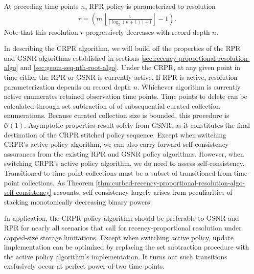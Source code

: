 At preceding time points $n$, RPR policy is parameterized to resolution
\begin{align*}
r = \left(
  m \,
  \left\lfloor
  \frac{1}{\lceil \log_2(n + 1) \rceil + 1}
  \right\rfloor
  - 1
\right).
\end{align*}
Note that this resolution $r$ progressively decreases with record depth $n$.

In describing the CRPR algorithm, we will build off the properties of the RPR and GSNR algorithms established in sections \ref{sec:recency-proportional-resolution-algo} and \ref{sec:geom-seq-nth-root-algo}.
Under the CRPR, at any given point in time either the RPR or GSNR is currently active.
If RPR is active, resolution parameterization depends on record depth $n$.
Whichever algorithm is currently active enumerates retained observation time points.
Time points to delete can be calculated through set subtraction of of subsequential curated collection enumerations.
Because curated collection size is bounded, this procedure is $\mathcal{O}(1)$.
Asymptotic properties result solely from GSNR, as it constitutes the final destination of the CRPR stitched policy sequence.
Except when switching CRPR's active policy algorithm, we can also carry forward self-consistency assurances from the existing RPR and GSNR policy algorithms.
However, when switching CRPR's active policy algorithm, we do need to assess self-consistency.
Transitioned-to time point collections must be a subset of transitioned-from time point collections.
As Theorem \ref{thm:curbed-recency-proportional-resolution-algo-self-consistency} recounts, self-consistency largely arises from peculiarities of stacking monotonically decreasing binary powers.

In application, the CRPR policy algorithm should be preferable to GSNR and RPR for nearly all scenarios that call for recency-proportional resolution under capped-size storage limitations.
Except when switching active policy, update implementation can be optimized by replacing the set subtraction procedure with the active policy algorithm's implementation.
It turns out such transitions exclusively occur at perfect power-of-two time points.



